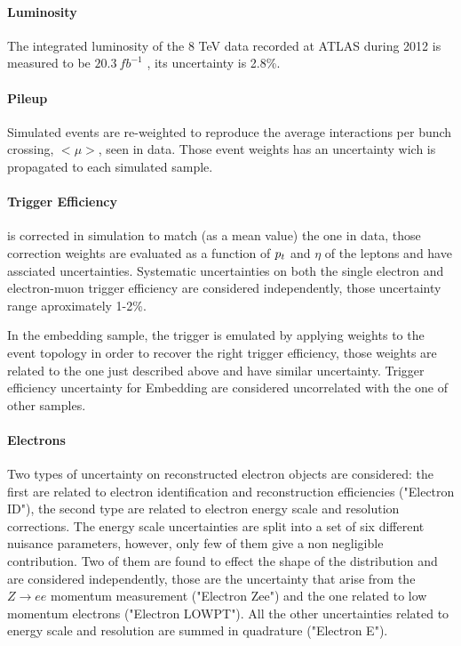 \paragraph{Luminosity}
The integrated luminosity of the 8 TeV data recorded at ATLAS during 2012 is measured to be $20.3 ~ fb^{-1}$ \cite{luminosity}, its uncertainty  is  2.8\%.

\paragraph{Pileup}
Simulated events are re-weighted to reproduce the average interactions per bunch crossing, $<\mu>$, seen in data. 
Those event weights has an uncertainty wich is propagated to each simulated sample.

\paragraph{Trigger Efficiency}
is corrected in simulation to match (as a mean value) the one in data, those correction weights 
are evaluated as a function of $p_{t}$ and $\eta$ of the leptons and have assciated uncertainties. 
Systematic uncertainties on both the single electron and electron-muon trigger efficiency are considered independently,  
those uncertainty range aproximately 1-2\%.

In the embedding sample, the trigger is emulated by applying weights to the event
topology in order to recover the right trigger efficiency, those weights are related to the one just described above
and have similar uncertainty. Trigger efficiency uncertainty for Embedding are considered uncorrelated with 
the one of other samples.

\paragraph{Electrons}
Two types of uncertainty on reconstructed electron objects are considered:
the first are related to electron identification and reconstruction efficiencies ("Electron ID"), 
the second type are related to electron energy scale and resolution corrections.
The energy scale uncertainties are split into a set of six different nuisance parameters, 
however, only few of them give a non negligible contribution. Two of them are found
to effect the shape of the \mmc distribution and are considered independently, those are the uncertainty
that arise from the $Z \rightarrow ee$ momentum measurement ("Electron Zee") 
and the one related to low momentum electrons ("Electron LOWPT"). 
All the other uncertainties related to energy scale and resolution are summed in quadrature ("Electron E").

